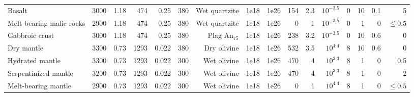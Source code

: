 \documentclass[draft]{agujournal2019}
\begin{document}
\begin{table}
\begin{threeparttable}
\begin{tabularx}{\textwidth}{L{2.75} R{0.5} R{0.5} R{0.5} R{0.5} R{0.5} R{1.5} R{0.5} R{0.5} R{0.5} R{0.5} R{0.75} R{0.75} R{0.75} R{0.5} R{0.75}}
   Basalt                    & 3000             & 1.18                                  & 474   & 0.25                & 380             & Wet quartzite  & 1e18         & 1e26        & 154              & 2.3   & $10^{-3.5}$           & 0                  & 10          & 0.1    & 5          \\

   Melt-bearing mafic rocks  & 2900             & 1.18                                  & 474   & 0.25                & 380             & Wet quartzite  & 1e18         & 1e26        & 0                & 1     & $10^{-3.5}$           & 0                  & 1           & 0      & $\leq 0.5$ \\

   Gabbroic crust            & 3000             & 1.18                                  & 474   & 0.25                & 380             & Plag An$_{75}$ & 1e18         & 1e26        & 238              & 3.2   & $10^{-3.5}$           & 0                  & 10          & 0.6    & 0          \\

   Dry mantle                & 3300             & 0.73                                  & 1293  & 0.022               & 380             & Dry olivine    & 1e18         & 1e26        & 532              & 3.5   & $10^{4.4}$            & 8                  & 10          & 0.6    & 0          \\

   Hydrated mantle           & 3300             & 0.73                                  & 1293  & 0.022               & 300             & Wet olivine    & 1e18         & 1e26        & 470              & 4     & $10^{3.3}$            & 8                  & 1           & 0      & 0.5        \\

   Serpentinized mantle      & 3200             & 0.73                                  & 1293  & 0.022               & 300             & Wet olivine    & 1e18         & 1e26        & 470              & 4     & $10^{3.3}$            & 8                  & 1           & 0      & 2          \\

   Melt-bearing mantle       & 2900             & 0.73                                  & 1293  & 0.022               & 300             & Wet olivine    & 1e18         & 1e26        & 0                & 1     & $10^{4.4}$            & 8                  & 1           & 0      & $\leq 0.5$ \\


\end{tabularx}
\end{threeparttable}
\end{table}
\end{document}
